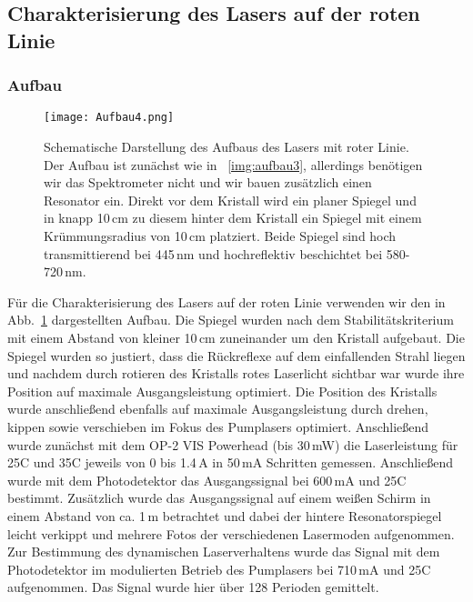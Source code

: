 \subsection{Charakterisierung des Lasers auf der roten Linie}

\subsubsection{Aufbau}

\begin{figure}[H]
\begin{center}
  \texttt{[image: Aufbau4.png]}
  \caption{Schematische Darstellung des Aufbaus des Lasers mit roter Linie. Der Aufbau ist zunächst wie in ~\ref{img:aufbau3}, allerdings benötigen wir das Spektrometer nicht und wir bauen zusätzlich einen Resonator ein.
   Direkt vor dem Kristall wird ein planer Spiegel und in knapp 10\,cm zu diesem hinter dem Kristall ein Spiegel mit einem Krümmungsradius von 10\,cm platziert. Beide Spiegel sind hoch transmittierend bei 445\,nm und hochreflektiv beschichtet bei 580-720\,nm.}
  \label{img:aufbau4}
\end{center}
\end{figure}

Für die Charakterisierung des Lasers auf der roten Linie verwenden wir den in Abb.~\ref{img:aufbau4} dargestellten Aufbau. Die Spiegel wurden nach dem Stabilitätskriterium mit einem Abstand von kleiner 10\,cm zuneinander um den Kristall aufgebaut. Die Spiegel wurden so justiert, dass die Rückreflexe auf dem einfallenden Strahl liegen und nachdem durch rotieren des Kristalls rotes Laserlicht sichtbar war wurde ihre Position auf maximale Ausgangsleistung optimiert. Die Position des Kristalls wurde anschließend ebenfalls auf maximale Ausgangsleistung durch drehen, kippen sowie verschieben im Fokus des Pumplasers optimiert. 
Anschließend wurde zunächst mit dem OP-2 VIS Powerhead (bis 30\,mW) die Laserleistung für 25\grad C und 35\grad C jeweils von 0 bis 1.4\,A in 50\,mA Schritten gemessen.
Anschließend wurde mit dem Photodetektor das Ausgangssignal bei 600\,mA und 25\grad C bestimmt. Zusätzlich wurde das Ausgangssignal auf einem weißen Schirm in einem Abstand von ca. 1\,m betrachtet und dabei der hintere Resonatorspiegel leicht verkippt und mehrere Fotos der verschiedenen Lasermoden aufgenommen. 
Zur Bestimmung des dynamischen Laserverhaltens wurde das Signal mit dem Photodetektor im modulierten Betrieb des Pumplasers bei 710\,mA und 25\grad C aufgenommen. Das Signal wurde hier über 128 Perioden gemittelt.




